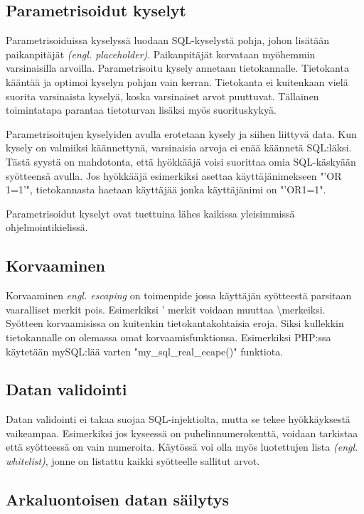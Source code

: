 \documentclass[finnish]{tktltiki2}
\theoremstyle{definition}
\theoremstyle{remark}
\begin{document}
		\subsection{Parametrisoidut kyselyt}
		Parametrisoiduissa kyselyssä luodaan SQL-kyselystä pohja, johon lisätään paikanpitäjät \textit{(engl. placeholder)}. Paikanpitäjät korvataan myöhemmin varsinaisilla arvoilla. Parametrisoitu kysely annetaan tietokannalle. Tietokanta kääntää ja optimoi kyselyn pohjan vain kerran. Tietokanta ei kuitenkaan vielä suorita varsinaista kyselyä, koska varsinaiset arvot puuttuvat. Tällainen toimintatapa parantaa tietoturvan lisäksi myös suorituskykyä.
		
		Parametrisoitujen kyselyiden avulla erotetaan kysely ja siihen liittyvä data. Kun kysely on valmiiksi käännettynä, varsinaisia arvoja ei enää käännetä SQL:läksi. Tästä syystä on mahdotonta, että hyökkääjä voisi suorittaa omia SQL-käskyään syötteensä avulla. Jos hyökkääjä esimerkiksi asettaa käyttäjänimekseen "'OR 1=1'", tietokannasta haetaan käyttäjää jonka käyttäjänimi on "'OR1=1".
		
		Parametrisoidut kyselyt ovat tuettuina lähes kaikissa yleisimmissä ohjelmointikielissä.
		
		\subsection{Korvaaminen}
		Korvaaminen \textit{engl. escaping} on toimenpide jossa käyttäjän syötteestä parsitaan vaaralliset merkit pois. Esimerkiksi ' merkit voidaan muuttaa \textbackslash merkeiksi. Syötteen korvaamisissa on kuitenkin tietokantakohtaisia eroja. Siksi kullekkin tietokannalle on olemassa omat korvaamisfunktionsa. Esimerkiksi PHP:ssa käytetään mySQL:lää varten "my{\_}sql{\_}real{\_}ecape()" funktiota.
		
		\subsection{Datan validointi}
		Datan validointi ei takaa suojaa SQL-injektiolta, mutta se tekee hyökkäyksestä vaikeampaa. Esimerkiksi jos kyseessä on puhelinnumerokenttä, voidaan tarkistaa että syötteessä on vain numeroita. Käytössä voi olla myös luotettujen lista \textit{(engl. whitelist)}, jonne on listattu kaikki syötteelle sallitut arvot.

		\subsection{Arkaluontoisen datan säilytys}
		
\end{document}
